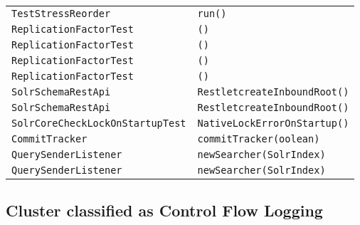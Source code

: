 \begin{center}
\begin{longtable}{ll}
\lstinline/TestStressReorder/&{\lstinline/run()/}\\
\lstinline/ReplicationFactorTest/&{\lstinline/()/}\\
\lstinline/ReplicationFactorTest/&{\lstinline/()/}\\
\lstinline/ReplicationFactorTest/&{\lstinline/()/}\\
\lstinline/ReplicationFactorTest/&{\lstinline/()/}\\
\lstinline/SolrSchemaRestApi/&{\lstinline/RestletcreateInboundRoot()/}\\
\lstinline/SolrSchemaRestApi/&{\lstinline/RestletcreateInboundRoot()/}\\
\lstinline/SolrCoreCheckLockOnStartupTest/&{\lstinline/NativeLockErrorOnStartup()/}\\
\lstinline/CommitTracker/&{\lstinline/commitTracker(oolean)/}\\
\lstinline/QuerySenderListener/&{\lstinline/newSearcher(SolrIndex)/}\\
\lstinline/QuerySenderListener/&{\lstinline/newSearcher(SolrIndex)/}\\
\end{longtable}
\end{center}

\subsection{Cluster classified as Control Flow Logging}

